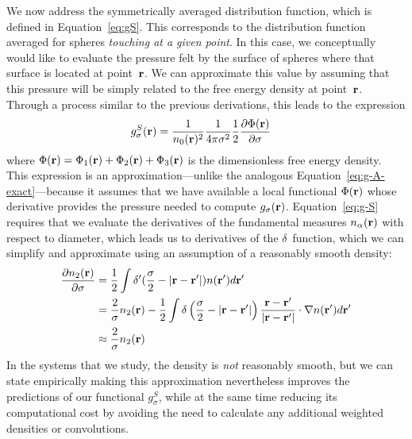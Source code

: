 We now address the symmetrically averaged distribution function, which
is defined in Equation~\ref{eq:gS}.  This corresponds to the
distribution function averaged for spheres \emph{touching at a given
  point}.  In this case, we conceptually would like to evaluate the
pressure felt by the surface of spheres where that surface is located
at point~$\textbf{r}$.  We can approximate this value by assuming that this
pressure will be simply related to the free energy density at
point~$\textbf{r}$.  Through a process similar to the previous derivations, this
leads to the expression
\begin{align}
  g_\sigma^S(\rr)%
  &= \frac{1}{n_0(\rr)^2}\frac{1}{ 4\pi \sigma^2}\frac12
  \frac{\partial \Phi(\rr)}{\partial \sigma} \label{eq:g-S}
\end{align}
where $\Phi(\textbf{r}) = \Phi_1(\textbf{r}) + \Phi_2(\textbf{r}) + \Phi_3(\textbf{r})$ is the
dimensionless free energy density.  This expression is an
approximation---unlike the analogous
Equation~\ref{eq:g-A-exact}---because it assumes that we have
available a local functional $\Phi(\textbf{r})$ whose derivative provides the
pressure needed to compute $g_\sigma(\textbf{r})$.  Equation~\ref{eq:g-S}
requires that we evaluate the derivatives of the fundamental measures
$n_\alpha(\textbf{r})$ with respect to diameter, which leads us to
derivatives of the $\delta$~function, which we can simplify and
approximate using an assumption of a reasonably smooth density:
\begin{align}
  \frac{\partial n_2(\textbf{r})}{\partial \sigma}
  &= \frac12 \int \delta'(\frac\sigma2 - |\textbf{r}-\textbf{r}'|) n(\textbf{r}')d\textbf{r}' \\
  &= \frac2{\sigma}n_2(\textbf{r}) - \frac12 \int \delta\left(\frac\sigma2 - |\textbf{r}-\textbf{r}'|\right)
  \frac{\textbf{r}-\textbf{r}'}{|\textbf{r}-\textbf{r}'|}\cdot\mathbf{\nabla}n(\textbf{r}')d\textbf{r}' \\
  &\approx \frac{2}{\sigma}n_2(\textbf{r})
\end{align}
In the systems that we study, the density is \emph{not} reasonably
smooth, but we can state empirically making this approximation
nevertheless improves the predictions of our functional $g_\sigma^S$, while at the
same time reducing its computational cost by avoiding the need to
calculate any additional weighted densities or convolutions.

